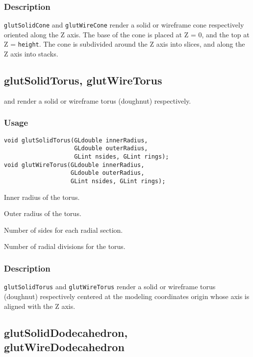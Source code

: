 \subsubsection*{Description}

{\tt glutSolidCone} and {\tt glutWireCone} render a solid or wireframe
cone respectively oriented along the Z axis.  The base of the cone
is placed at Z = 0, and the top at Z = {\tt height}.  The cone is subdivided
around the Z axis into slices, and along the Z axis into stacks.

\subsection{glutSolidTorus, glutWireTorus}

 and  render a solid or wireframe
torus (doughnut) respectively.

\subsubsection*{Usage}
\begin{verbatim}
void glutSolidTorus(GLdouble innerRadius,
                    GLdouble outerRadius,
                    GLint nsides, GLint rings);
void glutWireTorus(GLdouble innerRadius,
                   GLdouble outerRadius,
                   GLint nsides, GLint rings);
\end{verbatim}
\begin{description}
\itemsep 0in
\item[{\tt innerRadius}]
Inner radius of the torus.
\item[{\tt outerRadius}]
Outer radius of the torus.
\item[{\tt nsides}]
Number of sides for each radial section.
\item[{\tt rings}]
Number of radial divisions for the torus.
\end{description}

\subsubsection*{Description}

{\tt glutSolidTorus} and {\tt glutWireTorus} render a solid or wireframe
torus (doughnut) respectively centered at the modeling coordinates origin whose axis is aligned
with the Z axis.

\subsection{glutSolidDodecahedron, glutWireDodecahedron}

